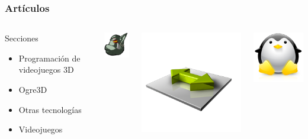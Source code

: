 \documentclass[green]{beamer}
\begin{document}
\begin{frame}
    \frametitle{Artículos}
        
    \begin{columns}[c]
    \column{180pt}
        
	\begin{block}{Secciones}
            \begin{itemize}
                \item Programación de videojuegos 3D
		\item Ogre3D
		\item Otras tecnologías
		\item Videojuegos
            \end{itemize}            
        \end{block}
	
    \column{60pt}
        
	\begin{center}
	    \includegraphics[scale=0.55]{img/iberogre-cabeza.png}
	\end{center}
	
	\begin{center}
	    \includegraphics[scale=0.18]{img/vectores.png}
	\end{center}

	\begin{center}
	    \includegraphics[scale=0.25]{img/tux.png}
	\end{center}
	

\end{columns}
\end{frame}
\end{document}

